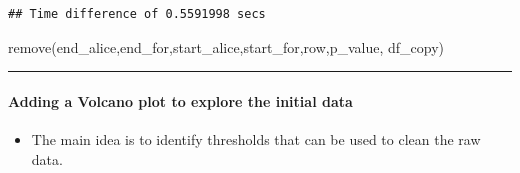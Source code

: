 \documentclass[
]{article}
\newenvironment{Shaded}{\begin{snugshade}}{\end{snugshade}}
\newcommand{\AttributeTok}[1]{\textcolor[rgb]{0.77,0.63,0.00}{#1}}
\newcommand{\CommentTok}[1]{\textcolor[rgb]{0.56,0.35,0.01}{\textit{#1}}}
\newcommand{\ControlFlowTok}[1]{\textcolor[rgb]{0.13,0.29,0.53}{\textbf{#1}}}
\newcommand{\DecValTok}[1]{\textcolor[rgb]{0.00,0.00,0.81}{#1}}
\newcommand{\FunctionTok}[1]{\textcolor[rgb]{0.00,0.00,0.00}{#1}}
\newcommand{\NormalTok}[1]{#1}
\newcommand{\OtherTok}[1]{\textcolor[rgb]{0.56,0.35,0.01}{#1}}
\newcommand{\SpecialCharTok}[1]{\textcolor[rgb]{0.00,0.00,0.00}{#1}}
\newcommand{\StringTok}[1]{\textcolor[rgb]{0.31,0.60,0.02}{#1}}
\providecommand{\tightlist}{%
  \setlength{\itemsep}{0pt}\setlength{\parskip}{0pt}}
\begin{document}
\begin{Shaded}
\end{Shaded}

\begin{verbatim}
## Time difference of 0.5591998 secs
\end{verbatim}

\begin{Shaded}
\begin{Highlighting}[]
\FunctionTok{remove}\NormalTok{(end\_alice,end\_for,start\_alice,start\_for,row,p\_value, df\_copy)}
\end{Highlighting}
\end{Shaded}

\begin{center}\rule{0.5\linewidth}{0.5pt}\end{center}

\hypertarget{adding-a-volcano-plot-to-explore-the-initial-data}{%
\paragraph{Adding a Volcano plot to explore the initial
data}\label{adding-a-volcano-plot-to-explore-the-initial-data}}

\begin{itemize}
\tightlist
\item
  The main idea is to identify thresholds that can be used to clean the
  raw data.
\end{itemize}
\end{document}
